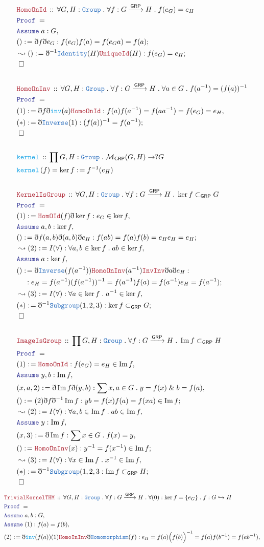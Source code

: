 \documentclass[12pt]{scrartcl}
\newcommand{\TYPE}[1]{\textcolor{NavyBlue}{\mathtt{#1}}}
\newcommand{\FUNC}[1]{\textcolor{Cerulean}{\mathtt{#1}}}
\newcommand{\LOGIC}[1]{\textcolor{Blue}{\mathtt{#1}}}
\newcommand{\THM}[1]{\textcolor{Maroon}{\mathtt{#1}}}
\renewcommand{\.}{\; . \;}
\newcommand{\de}{: \kern 0.1pc =}
\newcommand{\Act}[1]{\left( #1 \right)}
\newcommand{\Theorem}[2]{& \THM{#1} \, :: \, #2 \\ & \Proof = \\ }
\newcommand{\DeclareFunc}[2]{& \FUNC{#1} \, :: \, #2 \\}
\newcommand{\DefineNamedFunc}[4]{&  \FUNC{#1}\Act{#2} = #3 \de #4 \\}
\newcommand{\NewLine}{\\ & \kern 1pc}
\newcommand{\Page}[1]{ \begin{align*} #1 \end{align*}   }
\newcommand{ \bd }{ \ByDef }
\renewcommand{\And}{\; \& \;}
\DeclareMathOperator*{\im}{Im}
\newcommand{\ToInj}{\hookrightarrow}
\newcommand{\Say}[3]{& #1 \de #2 : #3, \\}
\newcommand{\Conclude}[3]{& #1 \de #2 : #3; \\}
\newcommand{\Derive}[3]{& \leadsto #1 \de #2 : #3, \\}
\newcommand{\DeriveConclude}[3]{& \leadsto #1 \de #2 : #3 ; \\}
\newcommand{\Assume}[2]{& \LOGIC{Assume} \; #1 : #2, \\}
\newcommand{\QED}{\; \square}
\newcommand{\EndProof}{& \QED \\}
\newcommand{\ByDef}{\eth}
\newcommand{\Proof}{\LOGIC{Proof} \; }
\newcommand{\Group}{\TYPE{Group}}
\newcommand{\Sgrp}{\subset_{\mathsf{GRP}}}
\newcommand{\GRP}{\mathsf{GRP}}
\begin{document}
\Page{
	\Theorem{HomoOnId}{\forall G,H : \Group \. \forall f : G \xrightarrow{\mathsf{GRP}} H 
		\. f(e_G) = e_H  
	}
	\Assume{a}{G}
	\Conclude{()}{  \bd f \bd e_G }{ f(e_G)f(a) = f(e_Ga) = f(a) }
	\DeriveConclude{()}{\bd^{-1} \TYPE{Identity}(H)\THM{UniqueId}(H)}{f(e_G) = e_H}
	\EndProof
	\\
	\Theorem{HomoOnInv}{\forall G,H : \Group \. \forall f : G \xrightarrow{\mathsf{GRP}} H 
		\. \forall a \in G \. f(a^{-1}) = (f(a))^{-1} }
	\Say{(1)}{  \bd f \bd \FUNC{inv}(a) \THM{HomoOnId}    }{f(a)f(a^{-1})  = f(aa^{-1}) = f(e_G) = e_H }
	\Conclude{(*)}{\bd \TYPE{Inverse}(1)  }{ (f(a))^{-1} = f(a^{-1})   }
	\EndProof
	\\
	\DeclareFunc{kernel}{\prod G,H : \Group  \. \mathcal{M}_{\mathsf{GRP}}(G,H) \to ?G }
	\DefineNamedFunc{kernel}{f}{\ker f}{ f^{-1}(e_H) }
	\\
	\Theorem{KernelIsGroup}{\forall G,H : \Group \. \forall f : G \xrightarrow{\mathsf{GRP}} H \. \ker f \Sgrp G}
	\Say{(1)}{\THM{HomOId}(f)\bd \ker f}{e_G \in \ker f }
	\Assume{a,b}{\ker f}
	\Conclude{()}{ \bd f(a,b) \bd (a,b) \bd e_H  }{f(ab) = f(a)f(b) = e_He_H = e_H}
	\Derive{(2)}{I(\forall)}{\forall a,b \in  \ker f \. ab \in \ker f}
	\Assume{a}{\ker f}
	\Conclude{()}{
		\bd \TYPE{Inverse}(f(a^{-1}))\THM{HomoOnInv}(a^{-1})
		\THM{InvInv} \bd a \bd e_H
		}{ \NewLine :
			e_H = f(a^{-1})(f(a^{-1}))^{-1} = f(a^{-1})f(a) = f(a^{-1})e_H = f(a^{-1})}
	\Derive{(3)}{I(\forall)}{\forall a \in \ker f \. a^{-1} \in \ker f}
	\Conclude{(*)}{\bd^{-1} \TYPE{Subgroup}(1,2,3)}{ \ker f  \Sgrp G}
	\EndProof
	\\
	\Theorem{ImageIsGroup}{\prod G,H : \Group \. \forall f : G \xrightarrow{\mathsf{GRP}} H \. \im f \Sgrp H}
	\Say{(1)}{ \THM{HomoOnId}  }{f(e_G) = e_H \in \im f}
	\Assume{y,b}{\im f}
	\Say{(x,a,2)}{\bd \im f \bd (y,b)}{ \sum x,a \in G \. y =f(x) \And b = f(a)  }
	\Conclude{()}{ (2) \bd f \bd^{-1} \im f}{  yb = f(x)f(a) = f(xa) \in \im f}
	\Derive{(2)}{I(\forall)}{ \forall a,b \in \im f \. ab \in \im f}
	\Assume{y}{\im f}
	\Say{(x,3)}{\bd \im f}{\sum x \in G \. f(x) = y}
	\Conclude{()}{\THM{HomoOnInv}(x)}{ y^{-1} = f(x^{-1}) \in \im f}
	\Derive{(3)}{I(\forall)}{\forall x \in \im f \. x^{-1} \in \im f }
	\Conclude{(*)}{\bd^{-1} \TYPE{Subgroup}(1,2,3}{\im f \Sgrp H}
	\EndProof
} \Page{
	\Theorem{TrivialKernelTHM}{\forall G,H : \TYPE{Group} \.  \forall f : G \xrightarrow{\GRP} H \.  
		\forall (0) :  \ker f = \{e_G\}   \.  f : G \ToInj H
	}
	\Assume{a,b}{G}
	\Assume{(1)}{f(a) = f(b)}
	\Say{(2)}{\bd \FUNC{inv}(f(a))(1) \THM{HomoInInv}\bd \TYPE{Homomorphism}(f)}
	{  e_H  =  f(a)\Big( f(b) \Big)^{-1} = f(a)f(b^{-1}) = f(ab^{-1})    } 
}
\end{document}
